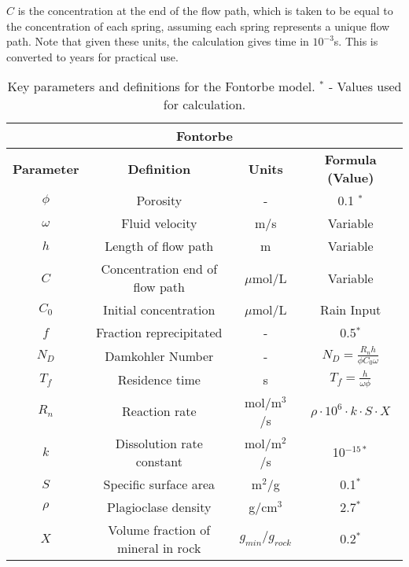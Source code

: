 \begin{tcolorbox}
{\begin{multicols}{2}
\end{multicols}
    
$C$ is the concentration at the end of the flow path, which is taken to be equal to the concentration of each spring, assuming each spring represents a unique flow path. Note that given these units, the calculation gives time in \( 10^{-3} \)s. This is converted to years for practical use.\\

\begin{table}[H]
    \setcounter{table}{0}  %
    \renewcommand{\thetable}{A\arabic{table}}  
    \centering
    \begin{tabular}{|c|c|c|c|}
        \hline
        \multicolumn{4}{|c|}{\textbf{Fontorbe}} \\  
        \hline
        \textbf{Parameter} & \textbf{Definition} & \textbf{Units} & \textbf{Formula (Value)} \\  
        \hline
        $\phi$ & Porosity & - & 0.1 $^*$\\
        $\omega$ & Fluid velocity & m/s & Variable \\
        $h$ & Length of flow path & m & Variable \\
        $C$ & Concentration \@ end of flow path & $\mu$mol/L & Variable \\
        $C_0$ & Initial concentration & $\mu$mol/L & Rain Input \\
        $f$ & Fraction reprecipitated & - & 0.5$^*$ \\
        $N_D$ & Damkohler Number & - & $N_D = \frac{R_n h}{\phi C_0 \omega}$ \\
        $T_f$ & Residence time & s & $T_f = \frac{h}{\omega\phi}$ \\
        $R_n$ & Reaction rate & mol/m$^3$/s & $\rho \cdot 10^6 \cdot k \cdot S \cdot X $ \\
        $k$ & Dissolution rate constant & mol/m$^2$/s & 10$^{-15*}$ \\
        $S$ & Specific surface area & m$^2$/g & 0.1$^*$ \\
        $\rho$ & Plagioclase density & g/cm$^3$ & 2.7$^*$ \\
        $X$ & Volume fraction of mineral in rock & $g_{min}/g_{rock}$ & 0.2$^*$ \\
        \hline
    \end{tabular}
    \caption{Key parameters and definitions for the Fontorbe model. $^*$ - Values used for calculation.}
    \label{tab:parameters3}
\end{table}
    
}

\end{tcolorbox}


